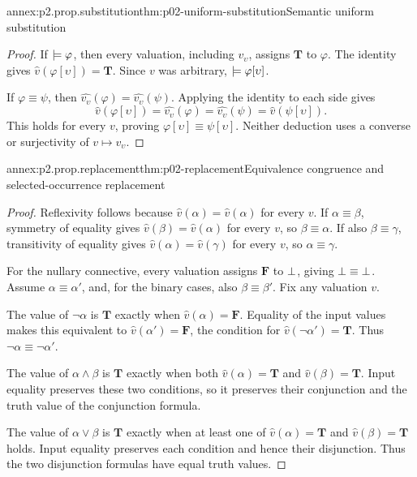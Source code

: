 \begin{annexitem}{annex:p2.prop.substitution}{thm:p02-uniform-substitution}{Semantic uniform substitution}
\begin{proof}
If \(\models\varphi\), then every valuation, including \(v_\upsilon\),
assigns \(\mathbf T\) to \(\varphi\).  The identity gives
\(\widehat v(\varphi[\upsilon])=\mathbf T\).  Since \(v\) was arbitrary,
\(\models\varphi[\upsilon]\).

If \(\varphi\equiv\psi\), then
\(\widehat{v_\upsilon}(\varphi)=\widehat{v_\upsilon}(\psi)\).
Applying the identity to each side gives
\[
 \widehat v(\varphi[\upsilon])
 =\widehat{v_\upsilon}(\varphi)
 =\widehat{v_\upsilon}(\psi)
 =\widehat v(\psi[\upsilon]).
\]
This holds for every \(v\), proving
\(\varphi[\upsilon]\equiv\psi[\upsilon]\).
Neither deduction uses a converse or surjectivity of
\(v\mapsto v_\upsilon\).
\end{proof}
\end{annexitem}

\begin{annexitem}{annex:p2.prop.replacement}{thm:p02-replacement}{Equivalence congruence and selected-occurrence replacement}
\begin{proof}
Reflexivity follows because
\(\widehat v(\alpha)=\widehat v(\alpha)\) for every \(v\).
If \(\alpha\equiv\beta\), symmetry of equality gives
\(\widehat v(\beta)=\widehat v(\alpha)\) for every \(v\), so
\(\beta\equiv\alpha\).  If also \(\beta\equiv\gamma\), transitivity of
equality gives \(\widehat v(\alpha)=\widehat v(\gamma)\) for every \(v\),
so \(\alpha\equiv\gamma\).

For the nullary connective, every valuation assigns \(\mathbf F\) to
\(\bot\), giving \(\bot\equiv\bot\).
Assume \(\alpha\equiv\alpha'\), and, for the binary cases, also
\(\beta\equiv\beta'\).  Fix any valuation \(v\).

The value of \(\neg\alpha\) is \(\mathbf T\) exactly when
\(\widehat v(\alpha)=\mathbf F\).  Equality of the input values makes this
equivalent to \(\widehat v(\alpha')=\mathbf F\), the condition for
\(\widehat v(\neg\alpha')=\mathbf T\).  Thus
\(\neg\alpha\equiv\neg\alpha'\).

The value of \(\alpha\land\beta\) is \(\mathbf T\) exactly when both
\(\widehat v(\alpha)=\mathbf T\) and \(\widehat v(\beta)=\mathbf T\).
Input equality preserves these two conditions, so it preserves their
conjunction and the truth value of the conjunction formula.

The value of \(\alpha\lor\beta\) is \(\mathbf T\) exactly when at least one of
\(\widehat v(\alpha)=\mathbf T\) and \(\widehat v(\beta)=\mathbf T\) holds.
Input equality preserves each condition and hence their disjunction.
Thus the two disjunction formulas have equal truth values.


\end{proof}
\end{annexitem}
